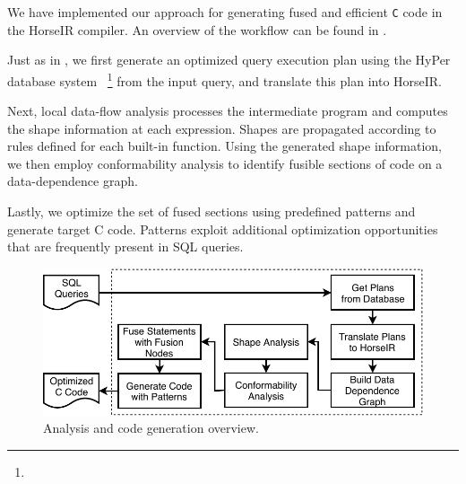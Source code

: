 We have implemented our approach for generating fused and efficient
\texttt{C} code in the HorseIR compiler. An overview of the workflow
can be found in .

Just as in \OldPaper, we first generate an optimized
query execution plan using the HyPer database system~\cite{Neumann2011:HyPer}
\footnote{}
from the input query, and translate this plan into HorseIR.

Next, local data-flow analysis processes the intermediate program and
computes the shape information at each expression. Shapes are propagated
according to rules defined for each built-in function. Using the
generated shape information, we then employ conformability analysis to
identify fusible sections of code on a data-dependence graph.

Lastly, we optimize the set of fused sections using predefined patterns
and generate target C code. Patterns exploit additional optimization
opportunities that are frequently present in SQL queries.

\begin{figure}[htbp]
\centering
\includegraphics[width=.95\columnwidth]{./src/figure/overview-v4.pdf}
\caption{Analysis and code generation overview.} \label{fig:overview}
\end{figure}
